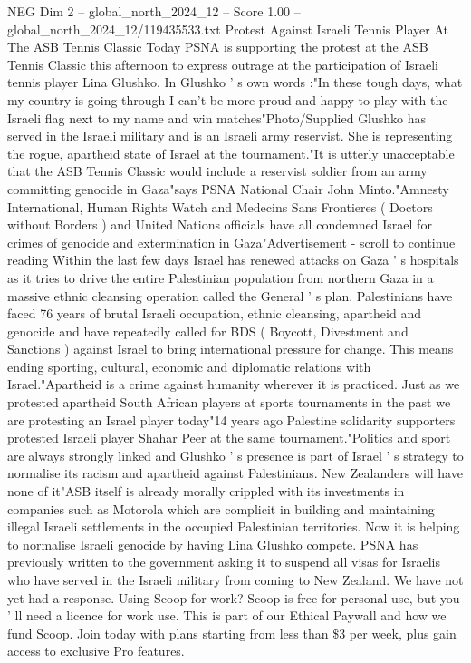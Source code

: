 \begin{textsample}{NEG Dim 2 – global\_north\_2024\_12 – Score 1.00 – global\_north\_2024\_12/119435533.txt}  \label{ex:f2_neg_172}
Protest Against Israeli Tennis Player At The ASB Tennis Classic Today PSNA is supporting the protest at the ASB Tennis Classic this afternoon to express outrage at the participation of Israeli tennis player Lina Glushko.
In Glushko ' s own words :"In these tough days, what my country is going through I can't be more proud and happy to play with the Israeli flag next to my name and win matches"Photo/Supplied Glushko has served in the Israeli military and is an Israeli army reservist.
She is representing the rogue, apartheid state of Israel at the tournament."It is utterly unacceptable that the ASB Tennis Classic would include a reservist soldier from an army committing genocide in Gaza"says PSNA National Chair John Minto."Amnesty International, Human Rights Watch and Medecins Sans Frontieres ( Doctors without Borders ) and United Nations officials have all condemned Israel for crimes of genocide and extermination in Gaza"Advertisement - scroll to continue reading Within the last few days Israel has renewed attacks on Gaza ' s hospitals as it tries to drive the entire Palestinian population from northern Gaza in a massive ethnic cleansing operation called the General ' s plan.
Palestinians have faced 76 years of brutal Israeli occupation, ethnic cleansing, apartheid and genocide and have repeatedly called for BDS ( Boycott, Divestment and Sanctions ) against Israel to bring international pressure for change.
This means ending sporting, cultural, economic and diplomatic relations with Israel."Apartheid is a crime against humanity wherever it is practiced.
Just as we protested apartheid South African players at sports tournaments in the past we are protesting an Israel player today"14 years ago Palestine solidarity supporters protested Israeli player Shahar Peer at the same tournament."Politics and sport are always strongly linked and Glushko ' s presence is part of Israel ' s strategy to normalise its racism and apartheid against Palestinians.
New Zealanders will have none of it"ASB itself is already morally crippled with its investments in companies such as Motorola which are complicit in building and maintaining illegal Israeli settlements in the occupied Palestinian territories.
Now it is helping to normalise Israeli genocide by having Lina Glushko compete.
PSNA has previously written to the government asking it to suspend all visas for Israelis who have served in the Israeli military from coming to New Zealand.
We have not yet had a response.
Using Scoop for work?
Scoop is free for personal use, but you ' ll need a licence for work use.
This is part of our Ethical Paywall and how we fund Scoop.
Join today with plans starting from less than \$3 per week, plus gain access to exclusive Pro features.

\end{textsample}
